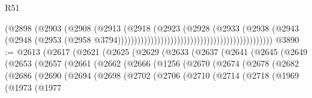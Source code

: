\begin{lexlean}{R51}
\begin{coremodule}
                                                                        (@2898
                                                                          (@2903
                                                                            (@2908
                                                                              (@2913
                                                                                (@2918
                                                                                  (@2923
                                                                                    (@2928
                                                                                      (@2933
                                                                                        (@2938
                                                                                          (@2943
                                                                                            (@2948
                                                                                              (@2953
                                                                                                (@2958
                                                                                                  @3794)))))))))))))))))))))))))))))))))))))))))))))))
@3890 := @2613
    (@2617
      (@2621
        (@2625
          (@2629
            (@2633
              (@2637
                (@2641
                  (@2645
                    (@2649
                      (@2653
                        (@2657
                          (@2661
                            (@2662
                              (@2666
                                (@1256
                                  (@2670
                                    (@2674
                                      (@2678
                                        (@2682
                                          (@2686
                                            (@2690
                                              (@2694
                                                (@2698
                                                  (@2702
                                                    (@2706
                                                      (@2710
                                                        (@2714
                                                          (@2718
                                                            (@1969
                                                              (@1973
                                                                (@1977

\end{coremodule}
\end{lexlean}

